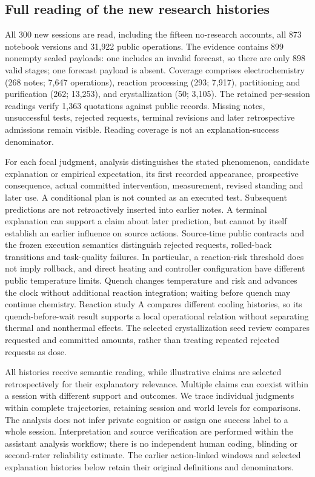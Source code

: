 \documentclass[12pt,a4paper]{article}
\begin{document}
\subsection{Full reading of the new research histories}\label{full-reading-of-the-new-research-histories}

All 300 new sessions are read, including the fifteen no-research accounts, all 873 notebook versions and 31,922 public operations. The evidence contains 899 nonempty sealed payloads: one includes an invalid forecast, so there are only 898 valid stages; one forecast payload is absent. Coverage comprises electrochemistry (268 notes; 7,647 operations), reaction processing (293; 7,917), partitioning and purification (262; 13,253), and crystallization (50; 3,105). The retained per-session readings verify 1,363 quotations against public records. Missing notes, unsuccessful tests, rejected requests, terminal revisions and later retrospective admissions remain visible. Reading coverage is not an explanation-success denominator.

For each focal judgment, analysis distinguishes the stated phenomenon, candidate explanation or empirical expectation, its first recorded appearance, prospective consequence, actual committed intervention, measurement, revised standing and later use. A conditional plan is not counted as an executed test. Subsequent predictions are not retroactively inserted into earlier notes. A terminal explanation can support a claim about later prediction, but cannot by itself establish an earlier influence on source actions. Source-time public contracts and the frozen execution semantics distinguish rejected requests, rolled-back transitions and task-quality failures. In particular, a reaction-risk threshold does not imply rollback, and direct heating and controller configuration have different public temperature limits. Quench changes temperature and risk and advances the clock without additional reaction integration; waiting before quench may continue chemistry. Reaction study A compares different cooling histories, so its quench-before-wait result supports a local operational relation without separating thermal and nonthermal effects. The selected crystallization seed review compares requested and committed amounts, rather than treating repeated rejected requests as dose.

All histories receive semantic reading, while illustrative claims are selected retrospectively for their explanatory relevance. Multiple claims can coexist within a session with different support and outcomes. We trace individual judgments within complete trajectories, retaining session and world levels for comparisons. The analysis does not infer private cognition or assign one success label to a whole session. Interpretation and source verification are performed within the assistant analysis workflow; there is no independent human coding, blinding or second-rater reliability estimate. The earlier action-linked windows and selected explanation histories below retain their original definitions and denominators.
\end{document}
